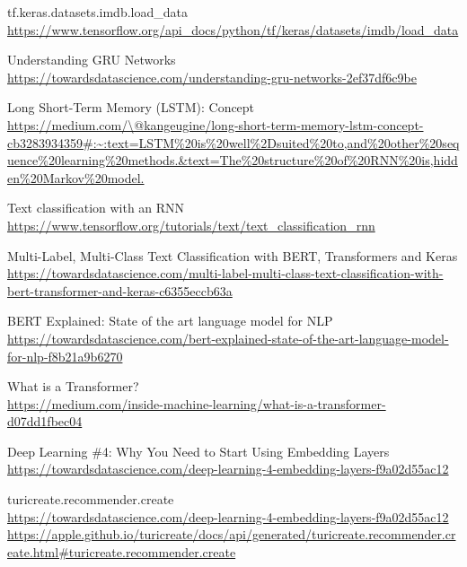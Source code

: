 \documentclass[12pt]{article}
\begin{document}
\begin{thebibliography}{12}
    
    tf.keras.datasets.imdb.load\_data
    \\\url{https://www.tensorflow.org/api\_docs/python/tf/keras/datasets/imdb/load\_data}

    Understanding GRU Networks
    \\\url{https://towardsdatascience.com/understanding-gru-networks-2ef37df6c9be}

    Long Short-Term Memory (LSTM): Concept
    \\\url{https://medium.com/\@kangeugine/long-short-term-memory-lstm-concept-cb3283934359\#:~:text=LSTM\%20is\%20well\%2Dsuited\%20to,and\%20other\%20sequence\%20learning\%20methods.\&text=The\%20structure\%20of\%20RNN\%20is,hidden\%20Markov\%20model.}
    
    Text classification with an RNN
    \\\url{https://www.tensorflow.org/tutorials/text/text\_classification\_rnn}

    Multi-Label, Multi-Class Text Classification with BERT, Transformers and Keras
    \\\url{https://towardsdatascience.com/multi-label-multi-class-text-classification-with-bert-transformer-and-keras-c6355eccb63a}

    BERT Explained: State of the art language model for NLP
    \\\url{https://towardsdatascience.com/bert-explained-state-of-the-art-language-model-for-nlp-f8b21a9b6270}

    What is a Transformer?
    \\\url{https://medium.com/inside-machine-learning/what-is-a-transformer-d07dd1fbec04}

    Deep Learning \#4: Why You Need to Start Using Embedding Layers
    \\\url{https://towardsdatascience.com/deep-learning-4-embedding-layers-f9a02d55ac12}

    turicreate.recommender.create
    \\\url{https://towardsdatascience.com/deep-learning-4-embedding-layers-f9a02d55ac12}
    \\\url{https://apple.github.io/turicreate/docs/api/generated/turicreate.recommender.create.html#turicreate.recommender.create}

    \end{thebibliography}
\end{document}
